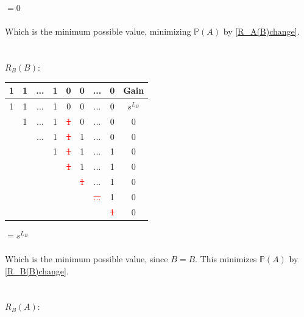 \documentclass[english,12pt,a4paper,final]{article}
\begin{document}
$=0$
\\\\
Which is the minimum possible value, minimizing $\mathbb{P}(A)$ by \eqref{R_A(B)change}.
\\\\\\
${R_B(B)}$:
\begin{tabular}{|cccccccc|c|}
	\hline
	1 & 1 & ... & 1 & 0 & 0 & ... & 0 & Gain \\
	\hline
	
	\textcolor{OliveGreen}{1} & \textcolor{OliveGreen}{1} & \textcolor{OliveGreen}{...} & \textcolor{OliveGreen}{1} & \textcolor{OliveGreen}{0} & \textcolor{OliveGreen}{0} & \textcolor{OliveGreen}{...} & \textcolor{OliveGreen}{0} & $s^{L_B}$\\
	
	& \textcolor{OliveGreen}{1} & \textcolor{OliveGreen}{...} & \textcolor{OliveGreen}{1} & \textcolor{red}{\sout{1}} & 0 & ... & 0 & $0$ \\
	
	&  & \textcolor{OliveGreen}{...} & \textcolor{OliveGreen}{1} & \textcolor{red}{\sout{1}} & 1 & ... & 0 & $0$ \\
	
	&  &  & \textcolor{OliveGreen}{1} & \textcolor{red}{\sout{1}} & 1 & ... & 1 & $0$ \\
	
	&  &  &  & \textcolor{red}{\sout{1}} & 1 & ... & 1 & $0$ \\
	
	&  &  &  &  & \textcolor{red}{\sout{1}} & ... & 1 & $0$ \\
	
	&  &  &  &  &  & \textcolor{red}{\sout{...}} & 1 & $0$ \\
	
	&  &  &  &  &  &  & \textcolor{red}{\sout{1}} & $0$ \\
	\hline
\end{tabular}
$=s^{L_B}$
\\\\
Which is the minimum possible value, since $B=B$. This minimizes $\mathbb{P}(A)$ by \eqref{R_B(B)change}.
\\\\\\
${R_B(A)}$:
\end{document}
